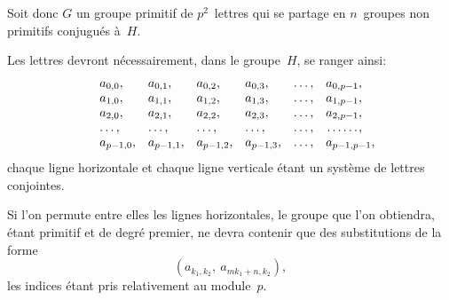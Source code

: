 \documentclass[leqno,12pt]{book}[2005/09/16]
\newcommand{\DPtypo}[2]{#2}
\begin{document}
Soit donc $G$ un groupe primitif de $p^{2}$~lettres qui se partage
en $n$~groupes non primitifs conjugués à~$H$.

Les lettres devront nécessairement, dans le groupe~$H$, se ranger
ainsi:
\[
\begin{array}{*{6}{l}}
  a_{0,0}, & a_{0,1}, & a_{0,2}, & a_{0,3}, & \dots, & a_{0,p-1},\\
  a_{1,0}, & a_{1,1}, & a_{1,2}, & a_{1,3}, & \dots, & a_{1,p-1},\\
  a_{2,0}, & a_{2,1}, & a_{2,2}, & a_{2,3}, & \dots, & a_{2,p-1},\\
  \dots,  & \dots,  & \dots,  & \dots,  & \dots, & \dotfill, \\
  a_{p-1,0}, & a_{p-1,1}, & a_{p-1,2}, & a_{p-1,3}, & \dots, & \rlap{$a_{p-1,p-1},$}
\end{array}
\]
chaque ligne horizontale et chaque ligne verticale étant un système
de lettres conjointes.

Si l'on permute entre elles les lignes horizontales, le groupe
que l'on obtiendra, étant primitif et de degré premier, ne devra
contenir que des substitutions de la forme
\[
(a_{k_{1},k_{2}},\ a_{mk_{1}+n\DPtypo{}{,} k_{2}}),
\]
les indices étant pris relativement au module~$p$.
\end{document}
